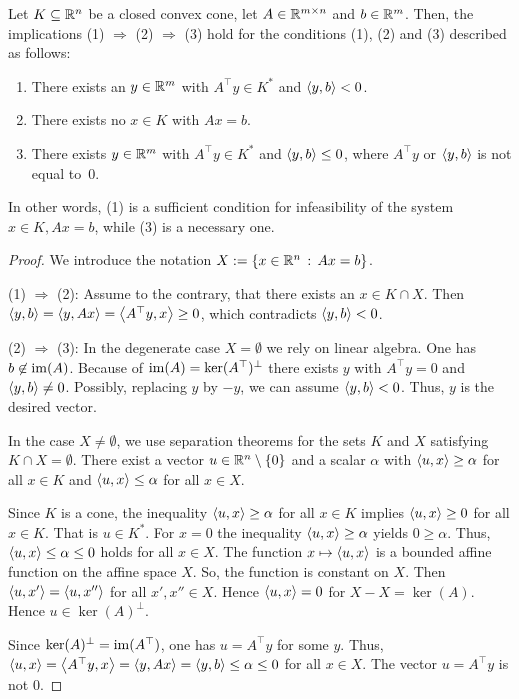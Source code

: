 \begin{theorem}[Farkas-lemma for the system $x \in K, A x =b$]
	\label{thm:farkas:kegel}
	Let $K \subseteq \mathbb{R}^n$ be a closed convex cone, let $A \in \mathbb{R}^{m \times n}$ and $b \in \mathbb{R}^m$. Then, the implications (1) $\Rightarrow$ (2) $\Rightarrow$ (3) hold for the conditions (1), (2) and (3) described as follows: 
	\begin{enumerate}[(1)]
		\item There exists an $y \in \mathbb{R}^m$ with $A^\top y \in K^\ast$ and $\left\langle y , b \right\rangle < 0$.
		\item There exists no $x \in K$ with $A x = b$.
		\item There exists $y \in \mathbb{R}^m$ with $A^\top y \in K^\ast$ and $\left\langle y , b \right\rangle \le 0$, where $A^\top y$ or $\left\langle y , b \right\rangle$ is not equal to~$0$.
	\end{enumerate}
	In other words, (1) is a sufficient condition for infeasibility of the system $x \in K, A x = b$, while (3) is a necessary one.
\end{theorem}
\begin{proof}
	We introduce the notation $X := \left\{ x \in \mathbb{R}^n \,:\, A x = b \right\}$. 
	
	(1) $\Rightarrow$ (2): Assume to the contrary, that there exists an $x \in K \cap X$. Then $\left\langle y , b  \right\rangle = \left\langle y  , A x \right\rangle = \left\langle A^\top y , x \right\rangle \ge 0$, which contradicts $\left\langle y , b \right\rangle < 0$.
	
	(2) $\Rightarrow$ (3): In the degenerate case $X = \emptyset$ we rely on linear algebra. One has $b \not \in \operatorname{im}(A)$. Because of $\operatorname{im}(A)= \ker(A^\top)^\perp$ there exists $y$ with $A^\top y = 0$ and $\left\langle y , b \right\rangle \ne 0$. Possibly, replacing $y$ by $-y$, we can assume  $\left\langle y , b \right\rangle < 0$. Thus, $y$ is the desired vector. 
	
	In the case $X \ne \emptyset$, we use separation theorems for the sets $K$ and $X$ satisfying $K \cap X = \emptyset$. There exist a vector $u \in \mathbb{R}^n \setminus \{0\}$ and a scalar $\alpha$ with $\left\langle u , x \right\rangle \ge \alpha$ for all $x \in K$ and $\left\langle u , x \right\rangle \le \alpha$ for all $x \in X$. 
	
	Since $K$ is a cone, the inequality $\left\langle u , x \right\rangle \ge \alpha $ for all $x \in K$ implies $\left\langle u , x \right\rangle \ge 0$ for all $x \in K$. That is $u \in K^\ast$. For $x=0$ the inequality $\left\langle u , x \right\rangle  \ge \alpha$ yields $0 \ge \alpha$. Thus, $\left\langle u , x \right\rangle \le \alpha \le 0$ holds for all $x \in X$. The function $x \mapsto \left\langle u , x \right\rangle$ is a bounded affine function on the affine space $X$. So, the function is constant on $X$. Then $\left\langle u , x' \right\rangle = \left\langle u , x'' \right\rangle$ for all $x', x'' \in X$. Hence $\left\langle u , x \right\rangle =0$ for $X - X = \ker(A)$. Hence $u \in \ker(A)^\perp.$ 
	
	Since $\ker(A)^\perp = \operatorname{im}(A^\top)$, one has $u = A^\top y$ for some $y$. Thus, $\left\langle u , x \right\rangle = \left\langle A^\top y , x \right\rangle = \left\langle y , A x \right\rangle = \left\langle y , b \right\rangle \le \alpha \le 0$ for all $x \in X$. The vector $u=A^\top y$ is not  $0$.
\end{proof}

